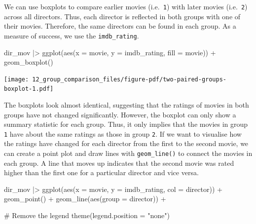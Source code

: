 \documentclass[
  letterpaper,
]{krantz}
\makeatletter
\newenvironment{Shaded}{\begin{snugshade}}{\end{snugshade}}
\newcommand{\AttributeTok}[1]{\textcolor[rgb]{0.40,0.45,0.13}{#1}}
\newcommand{\CommentTok}[1]{\textcolor[rgb]{0.37,0.37,0.37}{#1}}
\newcommand{\FunctionTok}[1]{\textcolor[rgb]{0.28,0.35,0.67}{#1}}
\newcommand{\NormalTok}[1]{\textcolor[rgb]{0.00,0.23,0.31}{#1}}
\newcommand{\SpecialCharTok}[1]{\textcolor[rgb]{0.37,0.37,0.37}{#1}}
\newcommand{\StringTok}[1]{\textcolor[rgb]{0.13,0.47,0.30}{#1}}
\newenvironment{kframe}{%
\medskip{}
\setlength{\fboxsep}{.8em}
 \def\at@end@of@kframe{}%
 \ifinner\ifhmode%
  \def\at@end@of@kframe{\end{minipage}}%
  \begin{minipage}{\columnwidth}%
 \fi\fi%
 \def\FrameCommand##1{\hskip\@totalleftmargin \hskip-\fboxsep
 \colorbox{shadecolor}{##1}\hskip-\fboxsep
     \hskip-\linewidth \hskip-\@totalleftmargin \hskip\columnwidth}%
 \MakeFramed {\advance\hsize-\width
   \@totalleftmargin\z@ \linewidth\hsize
   \@setminipage}}%
 {\par\unskip\endMakeFramed%
 \at@end@of@kframe}
\renewenvironment{Shaded}{\begin{kframe}}{\end{kframe}}
\makeatother
\begin{document}
We can use boxplots to compare earlier movies (i.e.~\texttt{1}) with
later movies (i.e.~\texttt{2}) across all directors. Thus, each director
is reflected in both groups with one of their movies. Therefore, the
same directors can be found in each group. As a measure of success, we
use the \texttt{imdb\_rating}.

\begin{Shaded}
\begin{Highlighting}[]
\NormalTok{dir\_mov }\SpecialCharTok{|\textgreater{}}
  \FunctionTok{ggplot}\NormalTok{(}\FunctionTok{aes}\NormalTok{(}\AttributeTok{x =}\NormalTok{ movie, }\AttributeTok{y =}\NormalTok{ imdb\_rating, }\AttributeTok{fill =}\NormalTok{ movie)) }\SpecialCharTok{+}
  \FunctionTok{geom\_boxplot}\NormalTok{()}
\end{Highlighting}
\end{Shaded}

\texttt{[image: 12\_group\_comparison\_files/figure-pdf/two-paired-groups-boxplot-1.pdf]}

The boxplots look almost identical, suggesting that the ratings of
movies in both groups have not changed significantly. However, the
boxplot can only show a summary statistic for each group. Thus, it only
implies that the movies in group \texttt{1} have about the same ratings
as those in group \texttt{2}. If we want to visualise how the ratings
have changed for each director from the first to the second movie, we
can create a point plot and draw lines with \texttt{geom\_line()} to
connect the movies in each group. A line that moves up indicates that
the second movie was rated higher than the first one for a particular
director and vice versa.

\begin{Shaded}
\begin{Highlighting}[]
\NormalTok{dir\_mov }\SpecialCharTok{|\textgreater{}}
  \FunctionTok{ggplot}\NormalTok{(}\FunctionTok{aes}\NormalTok{(}\AttributeTok{x =}\NormalTok{ movie, }\AttributeTok{y =}\NormalTok{ imdb\_rating, }\AttributeTok{col =}\NormalTok{ director)) }\SpecialCharTok{+}
  \FunctionTok{geom\_point}\NormalTok{() }\SpecialCharTok{+}
  \FunctionTok{geom\_line}\NormalTok{(}\FunctionTok{aes}\NormalTok{(}\AttributeTok{group =}\NormalTok{ director)) }\SpecialCharTok{+}
  
  \CommentTok{\# Remove the legend}
  \FunctionTok{theme}\NormalTok{(}\AttributeTok{legend.position =} \StringTok{"none"}\NormalTok{)}
\end{Highlighting}
\end{Shaded}
\end{document}
